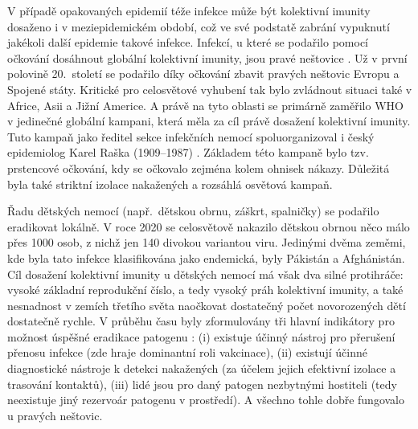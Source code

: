 V případě opakovaných epidemií téže infekce může být kolektivní imunity dosaženo i v meziepidemickém období, což ve své podstatě zabrání vypuknutí jakékoli další epidemie takové infekce. Infekcí, u které se podařilo pomocí očkování dosáhnout globální kolektivní imunity, jsou pravé neštovice \cite{smallpox1}. Už v první polovině 20.\ století se podařilo díky očkování zbavit pravých neštovic Evropu a Spojené státy. Kritické pro celosvětové vyhubení tak bylo zvládnout situaci také v Africe, Asii a Jižní Americe. A právě na tyto oblasti se primárně zaměřilo WHO v jedinečné globální kampani, která měla za cíl právě dosažení kolektivní imunity. Tuto kampaň jako ředitel sekce infekčních nemocí spoluorganizoval i český epidemiolog Karel Raška (1909--1987) \cite{smallpox2}. Základem této kampaně bylo tzv. prstencové očkování, kdy se očkovalo zejména kolem ohnisek nákazy. Důležitá byla také striktní izolace nakažených a rozsáhlá osvětová kampaň.

Řadu dětských nemocí (např.\ dětskou obrnu, záškrt, spalničky) se podařilo eradikovat lokálně. V roce 2020 se celosvětově nakazilo dětskou obrnou něco málo přes 1000 osob, z nichž jen 140 divokou variantou viru. Jedinými dvěma zeměmi, kde byla tato infekce klasifikována jako endemická, byly Pákistán a Afghánistán. Cíl dosažení kolektivní imunity u dětských nemocí má však dva silné protihráče: vysoké základní reprodukční číslo, a tedy vysoký práh kolektivní imunity, a také nesnadnost v zemích třetího světa naočkovat dostatečný počet novorozených dětí dostatečně rychle. V průběhu času byly zformulovány tři hlavní indikátory pro možnost úspěšné eradikace patogenu \cite{Dowdle1999}: (i) existuje účinný nástroj pro přerušení přenosu infekce (zde hraje dominantní roli vakcinace), (ii) existují účinné diagnostické nástroje k detekci nakažených (za účelem jejich efektivní izolace a trasování kontaktů), (iii) lidé jsou pro daný patogen nezbytnými hostiteli (tedy neexistuje jiný rezervoár patogenu v prostředí). A všechno tohle dobře fungovalo u pravých neštovic.

